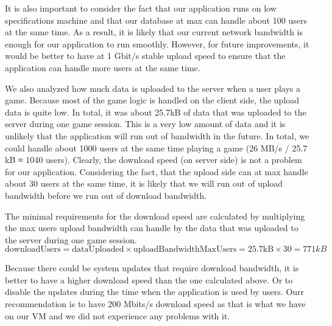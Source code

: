 \documentclass[]{VUMIFTemplateClass}
\begin{document}
It is also important to consider the fact that our application runs on low specifications machine and that our database at max can handle about 100 users at the same time.
As a result, it is likely that our current network bandwidth is enough for our application to run smoothly. However, for future improvements, it would be better to have at 1 Gbit/s stable upload speed to ensure that the application can handle more users at the same time.

We also analyzed how much data is uploaded to the server when a user plays a game. Because most of the game logic is handled on the client side, the upload data is quite low.
In total, it was about 25.7kB of data that was uploaded to the server during one game session. This is a very low amount of data and it is unlikely that the application will run out of bandwidth in the future.
In total, we could handle about 1000 users at the same time playing a game (26 MB/s / 25.7 kB ≈ 1040 users). Clearly, the download speed (on server side) is not a problem for our application. Considering the fact, that 
the upload side can at max handle about 30 users at the same time, it is likely that we will run out of upload bandwidth before we run out of download bandwidth.

The minimal requirements for the download speed are calculated by multiplying the max users upload bandwidth can handle by the data that was uploaded to the server during one game session. 
\[
\text{downloadUsers} = \text{dataUploaded} \times \text{uploadBandwidthMaxUsers} = 25.7 \text{kB} \times 30 = 771 kB
\]

Because there could be system updates that require download bandwidth, it is better to have a higher download speed than the one calculated above. Or to disable the updates during the time when the application is used by users. Ourr
recommendation is to have 200 Mbits/s download speed as that is what we have on our VM and we did not experience any problems with it.
\end{document}
